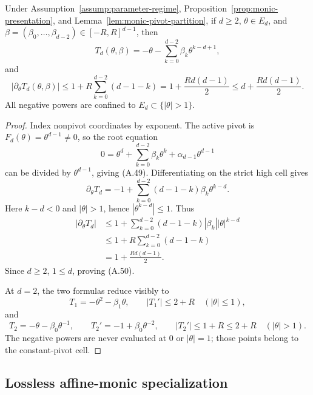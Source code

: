\begin{lemma}
\label{lem:monic-high-chart}
Under Assumption~\ref{assump:parameter-regime},
Proposition~\ref{prop:monic-presentation}, and
Lemma~\ref{lem:monic-pivot-partition}, if $d\geq2$,
$\theta\in E_d$, and
$\beta=(\beta_0,\ldots,\beta_{d-2})\in[-R,R]^{d-1}$, then
\[
T_d(\theta,\beta)
=-\theta-\sum_{k=0}^{d-2}\beta_k\theta^{k-d+1},
\tag{A.49}
\]
and
\[
|\partial_\theta T_d(\theta,\beta)|
\leq1+R\sum_{k=0}^{d-2}(d-1-k)
=1+\frac{Rd(d-1)}2
\leq d+\frac{Rd(d-1)}2.
\tag{A.50}
\]
All negative powers are confined to $E_d\subset\{|\theta|>1\}$.
\end{lemma}

\begin{proof}
Index nonpivot coordinates by exponent.  The active pivot is
$F_d(\theta)=\theta^{d-1}\neq0$, so the root equation
\[
0=\theta^d+\sum_{k=0}^{d-2}\beta_k\theta^k
 +\alpha_{d-1}\theta^{d-1}
\]
can be divided by $\theta^{d-1}$, giving (A.49).  Differentiating on the
strict high cell gives
\[
\partial_\theta T_d
=-1+\sum_{k=0}^{d-2}(d-1-k)\beta_k\theta^{k-d}.
\]
Here $k-d<0$ and $|\theta|>1$, hence $|\theta^{k-d}|\leq1$.  Thus
\[
\begin{aligned}
|\partial_\theta T_d|
&\leq1+\sum_{k=0}^{d-2}(d-1-k)
 |\beta_k||\theta|^{k-d}\\
&\leq1+R\sum_{k=0}^{d-2}(d-1-k)\\
&=1+\frac{Rd(d-1)}2.
\end{aligned}
\]
Since $d\geq2$, $1\leq d$, proving (A.50).

At $d=2$, the two formulas reduce visibly to
\[
T_1=-\theta^2-\beta_1\theta,
\qquad
|T_1'|\leq2+R
\quad(|\theta|\leq1),
\]
and
\[
T_2=-\theta-\beta_0\theta^{-1},
\qquad
T_2'=-1+\beta_0\theta^{-2},
\qquad
|T_2'|\leq1+R\leq2+R
\quad(|\theta|>1).
\]
The negative powers are never evaluated at $0$ or $|\theta|=1$; those
points belong to the constant-pivot cell.
\end{proof}

\subsection{Lossless affine-monic specialization}
\label{app:monic-specialization}

